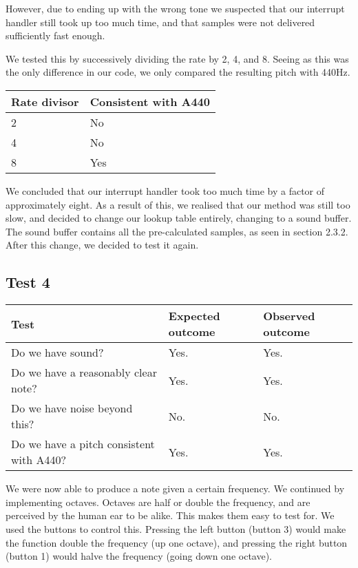 However, due to ending up with the wrong tone we suspected that our interrupt handler still took up too much
time, and that samples were not delivered sufficiently fast enough.

We tested this by successively dividing the rate by 2, 4, and 8. Seeing as this was the only difference in our code, we only compared the resulting pitch with 440Hz.
\begin{center}
\begin{tabular}{|l|l|}
\hline
{\sc Rate divisor} & {\sc Consistent with A440} \\ \hline
2 & No \\ \hline
4 & No \\ \hline
8 & Yes \\ \hline
\end{tabular}
\end{center}

We concluded that our interrupt handler took too much time by a factor
of approximately eight. As a result of this, we realised that our method
was still too slow, and decided to change our lookup table entirely,
changing to a sound buffer. The sound buffer contains all the
pre-calculated samples, as seen in section 2.3.2. After this change,
we decided to test it again.

\subsection*{Test 4}
\begin{center}
\begin{tabular}{|p{3.6cm}|p{3.6cm}|p{3.6cm}|}
\hline
{\sc Test} & {\sc Expected outcome} & {\sc Observed outcome}\\ \hline
Do we have sound? & Yes. & Yes. \\ \hline
Do we have a reasonably clear note? & Yes. & Yes. \\ \hline
Do we have noise beyond this? & No. & No. \\ \hline
Do we have a pitch consistent with A440? & Yes. & Yes. \\ \hline
\end{tabular}
\end{center}

We were now able to produce a note given a certain frequency. We
continued by implementing octaves. Octaves are half or double the
frequency, and are perceived by the human ear to be alike. This makes
them easy to test for. We used the buttons to control this. Pressing the
left button (button 3) would make the function double the frequency (up
one octave), and pressing the right button (button 1) would halve the
frequency (going down one octave).

